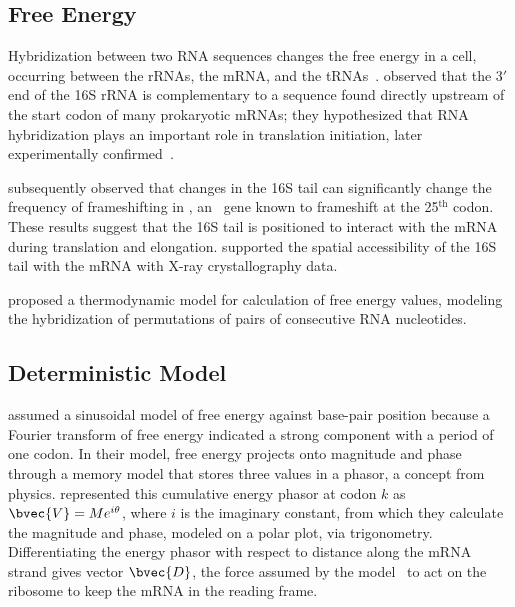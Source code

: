 \documentclass[twocolumn]{article}
\begin{document}
\subsection{Free Energy}
\label{freeenergy}

Hybridization between two RNA sequences changes the free energy in a
cell, occurring between the rRNAs, the mRNA, and the tRNAs~\cite{starmer}.
\citet{sd} observed that the $3'$ end of the 16S rRNA is complementary to a sequence found 
directly upstream of the start codon of many prokaryotic mRNAs; they hypothesized that RNA hybridization 
plays an important role in translation initiation, later
experimentally confirmed~\cite{hui,jacob}.

\citet{weiss87} subsequently observed that changes in the 16S tail can 
significantly change the frequency of frameshifting in \prfB, an \ecoli\ gene 
known to frameshift at the 25$^\textrm{th}$ codon.  These results suggest that 
the 16S tail is positioned to interact with the mRNA during
translation and elongation. 
\citet{xray} supported the spatial accessibility of the 16S tail with the mRNA with 
X-ray crystallography data.

\citet{freier} proposed a thermodynamic model for calculation of free energy values,
modeling the hybridization of permutations of pairs of consecutive RNA nucleotides.

\subsection{Deterministic Model}
\citet{lalit:mechanics} assumed a sinusoidal model of free energy against base-pair position 
because a Fourier transform of free energy indicated a strong component with a period of one codon.  
In their model,
free energy projects onto magnitude and
phase through a memory model that stores three values
in a phasor, a concept from physics. 
\citeauthor{lalit:mechanics} represented this cumulative energy phasor
at codon $k$ as $\bvec{V} = Me^{i\theta}$, where $i$ is the imaginary
constant, from which they calculate the magnitude and phase, modeled
on a polar plot, via
trigonometry. Differentiating the energy phasor
with respect to distance along the mRNA strand gives 
vector $\bvec{D}$, the force assumed by the model~\cite{lalit:mechanics}
to act on the ribosome to keep the mRNA in the reading frame.
 
\end{document}
